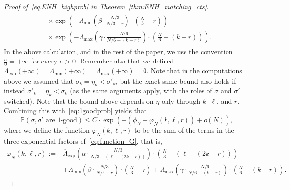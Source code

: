 \documentclass[11pt]{article}
\numberwithin{equation}{section}
\newcommand{\p}{\mathbb{P}} %
\theoremstyle{definition}
\begin{document}
\begin{proof}[Proof of~\eqref{eq:ENH_highprob} in Theorem~\ref{thm:ENH_matching_cts}]
\begin{multline}
\begin{aligned}
&\times \exp \left( - \overline{\Lambda}_{\min} \left( \beta \cdot \frac{N/3}{N/3 - r} \right) \cdot \left( \frac{N}{3} - r \right) \right) \\
&\times \exp \left( - \overline{\Lambda}_{\max} \left( \gamma \cdot \frac{N/6}{N/6 - (k-r)} \right) \cdot \left( \frac{N}{6} - (k-r) \right) \right).\label{eq:function_G}
\end{aligned}
\end{multline}
In the above calculation, and in the rest of the paper, we use the convention $\frac{a}{0}=+\infty$ for every $a>0$. Remember also that we defined $\overline{\Lambda}_{\exp}(+\infty) = \overline{\Lambda}_{\min}(+\infty) = \overline{\Lambda}_{\max}(+\infty) = 0$.
Note that in the computations above we assumed that 
$\sigma_{k} = \eta_{k} < \sigma'_{k}$, 
but the exact same bound also holds if instead 
$\sigma'_{k} = \eta_{k} < \sigma_{k}$ (as the same arguments apply, with the roles of $\sigma$ and $\sigma'$ switched). Note that the bound above depends on $\eta$ only through $k$, $\ell$, and $r$. Combining this with~\eqref{eq:1goodprob} yields that 
\[
    \p \left( \sigma, \sigma' \text{ are 1-good} \right) 
\leq C \cdot  \exp \left(-(\phi_N + \varphi_N(k,\ell,r)) +o(N) \right),
\]
where we define the function $ \varphi_N(k,\ell,r)$  to be the sum of the terms  in the three exponential factors of~\eqref{eq:function_G}, that is, 
\begin{align}
     \varphi_N(k,\ell,r) := &  \overline{\Lambda}_{\exp} \left(  \alpha \cdot \frac{N/3}{N/3 - (\ell - (2k - r))} \right) \cdot \left( \frac{N}{3} - (\ell - (2k - r)) \right)\\
     & + \overline{\Lambda}_{\min} \left( \beta \cdot \frac{N/3}{N/3 - r} \right) \cdot \left( \frac{N}{3} - r \right)
     + \overline{\Lambda}_{\max} \left( \gamma \cdot \frac{N/6}{N/6 - (k-r)} \right) \cdot \left( \frac{N}{6} - (k-r) \right). 
\end{align}


\end{proof}
\end{document}
